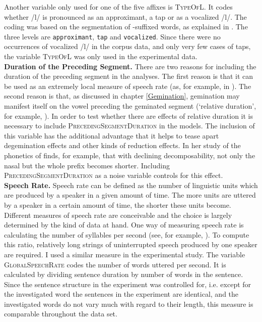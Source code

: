 Another variable only used for one of the five affixes is \textsc{TypeOfL}. It codes whether /l/ is pronounced as an approximant, a tap or as a vocalized /l/. The coding was based on the segmentation of -suffixed words, as explained in . The three levels are \texttt{approximant}, \texttt{tap} and \texttt{vocalized}.  Since there were no occurrences of vocalized /l/ in the corpus data, and only very few cases of taps, the variable \textsc{TypeOfL} was only used in the experimental data.\\


\textbf{Duration of the Preceding Segment.} There are two reasons for including the duration of the preceding segment in the analyses. The first reason is that it can be used as an extremely local measure of speech rate (as, for example, in \citealt{Ernestus.2006}). The second reason is that, as discussed in chapter \ref{Gemination}, gemination may manifest itself on the vowel preceding the geminated segment (`relative duration', for example, \citealt{Ridouane.2010, Miller.1987, Oh.2012}). In order to test whether there are effects of relative duration it is necessary to include \textsc{PrecedingSegmentDuration} in the models. The inclusion of this variable has the additional advantage that it helps to tease apart degemination effects and other kinds of reduction effects. In her study of the phonetics of  \cite{Hay.2007} finds, for example, that with declining decomposability,  not only the nasal but the whole prefix becomes shorter. Including \textsc{PrecedingSegmentDuration} as a noise variable controls for this effect. \\


\textbf{Speech Rate.} Speech rate can be defined as the number of linguistic units which are produced by a speaker in a given amount of time. The more units are uttered by a speaker in a certain amount of time, the shorter these units become. Different measures of speech rate are conceivable and the choice is largely determined by the kind of data at hand. One way of measuring speech rate is calculating the number of syllables per second (see, for example, \citealt{Pluymaekers.2005, Plag.2017}). To compute this ratio, relatively long strings of uninterrupted speech produced by one speaker are required.  I used a similar measure in the experimental study. The variable \textsc{GlobalSpeechRate} codes the number of words uttered per second. It is calculated by dividing sentence duration by number of words in the sentence. Since the sentence structure in the experiment was controlled for, i.e. except for the investigated word the sentences in the experiment are identical, and the investigated words do not vary much with regard to their length, this measure is comparable throughout the data set. 

